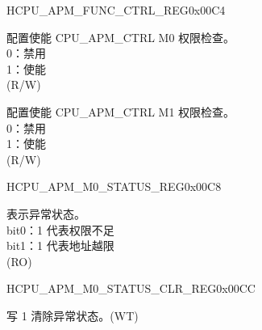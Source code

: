 \begin{register}{H}{CPU\_APM\_FUNC\_CTRL\_REG}{0x00C4}\label{regdesc:CPUAPMFUNCCTRLREG}
%
%
%
\regnewline%
\begin{regdesc}\begin{reglist}
\label{fielddesc:CPUAPMM0FUNCEN}\item [CPU\_APM\_M0\_FUNC\_EN] 配置使能 CPU\_APM\_CTRL M0 权限检查。\\
0：禁用\\
1：使能\\
(R/W)
\label{fielddesc:CPUAPMM1FUNCEN}\item [CPU\_APM\_M1\_FUNC\_EN] 配置使能 CPU\_APM\_CTRL M1 权限检查。\\
0：禁用\\
1：使能\\
(R/W)
\end{reglist}\end{regdesc}
\end{register}


\begin{register}{H}{CPU\_APM\_M0\_STATUS\_REG}{0x00C8}\label{regdesc:CPUAPMM0STATUSREG}
%
%
\regnewline%
\begin{regdesc}\begin{reglist}
\label{fielddesc:CPUAPMM0EXCEPTIONSTATUS}\item [CPU\_APM\_M0\_EXCEPTION\_STATUS] 表示异常状态。 \\
bit0：1 代表权限不足 \\
bit1：1 代表地址越限  \\
(RO)
\end{reglist}\end{regdesc}
\end{register}


\begin{register}{H}{CPU\_APM\_M0\_STATUS\_CLR\_REG}{0x00CC}\label{regdesc:CPUAPMM0STATUSCLRREG}
%
%
\regnewline%
\begin{regdesc}\begin{reglist}
\label{fielddesc:CPUAPMM0EXCEPTIONSTATUSCLR}\item [CPU\_APM\_M0\_EXCEPTION\_STATUS\_CLR] 写 1 清除异常状态。(WT)
\end{reglist}\end{regdesc}
\end{register}


